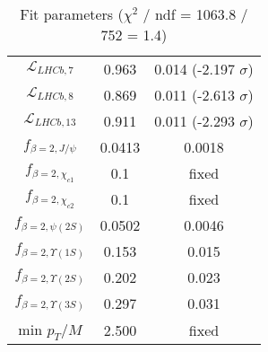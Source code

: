 \begin{table}[h!]
\begin{tabular}{c|c|c}
$\mathcal L_{LHCb,7}$ & 0.963 & 0.014 (-2.197 $\sigma$) \\
$\mathcal L_{LHCb,8}$ & 0.869 & 0.011 (-2.613 $\sigma$) \\
$\mathcal L_{LHCb,13}$ & 0.911 & 0.011 (-2.293 $\sigma$) \\
$f_{\beta=2,J/\psi}$ & 0.0413 & 0.0018 \\
$f_{\beta=2,\chi_{c1}}$ & 0.1 & fixed \\
$f_{\beta=2,\chi_{c2}}$ & 0.1 & fixed \\
$f_{\beta=2,\psi(2S)}$ & 0.0502 & 0.0046 \\
$f_{\beta=2,\Upsilon(1S)}$ & 0.153 & 0.015 \\
$f_{\beta=2,\Upsilon(2S)}$ & 0.202 & 0.023 \\
$f_{\beta=2,\Upsilon(3S)}$ & 0.297 & 0.031 \\
min $p_T/M$ & 2.500 & fixed \\
\end{tabular}
\caption{Fit parameters ($\chi^2$ / ndf = 1063.8 / 752 = 1.4)}
\end{table}
